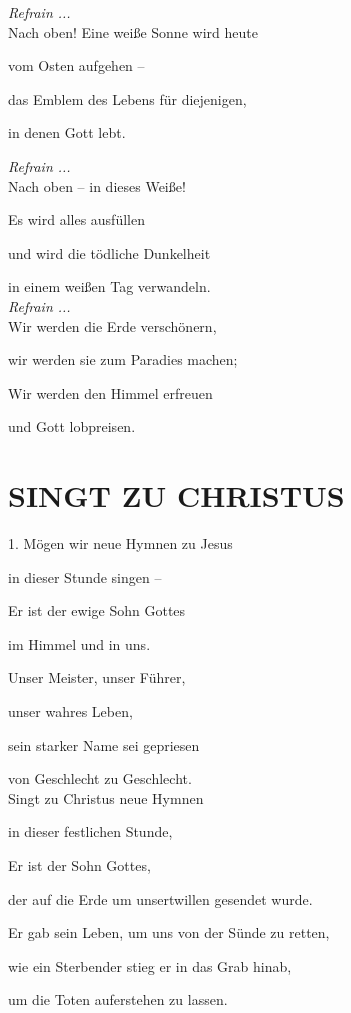 \documentclass[11pt,a5paper,twoside]{article}
\begin{document}
\textit{Refrain ...}\\

Nach oben! Eine weiße Sonne wird heute

vom Osten aufgehen --

das Emblem des Lebens für diejenigen,

in denen Gott lebt.

\textit{Refrain ...}\\

Nach oben -- in dieses Weiße!

Es wird alles ausfüllen

und wird die tödliche Dunkelheit

in einem weißen Tag verwandeln.\\

\textit{Refrain ...}\\

Wir werden die Erde verschönern,

wir werden sie zum Paradies machen;

Wir werden den Himmel erfreuen

und Gott lobpreisen. 

\section[Singt zu Christus]{SINGT ZU CHRISTUS}

1. Mögen wir neue Hymnen zu Jesus

in dieser Stunde singen --

Er ist der ewige Sohn Gottes 

im Himmel und in uns.

Unser Meister, unser Führer, 

unser wahres Leben,

sein starker Name sei gepriesen

von Geschlecht zu Geschlecht.\\

Singt zu Christus neue Hymnen

in dieser festlichen Stunde,

Er ist der Sohn Gottes, 

der auf die Erde um unsertwillen gesendet wurde.

Er gab sein Leben, um uns von der Sünde zu retten, 

wie ein Sterbender stieg er in das Grab hinab,

um die Toten auferstehen zu lassen. \\
\end{document}
